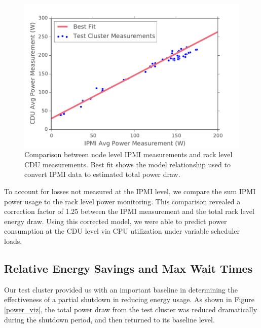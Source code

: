 \documentclass[letterpaper,twocolumn,10pt]{article}
\begin{document}
\begin{figure}[t]
	\begin{center}
		\includegraphics[scale=0.55]{ipmi_v_cdu}
	\end{center}
	\caption{Comparison between node level IPMI measurements and rack level CDU measurements. Best fit shows the model relationship used to convert IPMI data to estimated total power draw.}
	\label{ipmi_v_cdu}
\end{figure}

To account for losses not measured at the IPMI level, we compare the sum IPMI power usage to the rack level power monitoring.  This comparison revealed a correction factor of 1.25 between the IPMI measurement and the total rack level energy draw.  Using this corrected model, we were able to predict power consumption at the CDU level via CPU utilization under variable scheduler loads.

\subsection{Relative Energy Savings and Max Wait Times}

Our test cluster provided us with an important baseline in determining the effectiveness of a partial shutdown in reducing energy usage. As shown in Figure \ref{power_viz}, the total power draw from the test cluster was reduced dramatically during the shutdown period, and then returned to its baseline level.  
\end{document}
